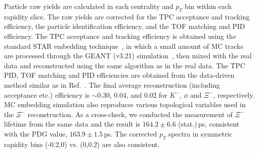 \documentclass[aps,tightenlines,superscriptaddress,twocolumn]{revtex4-1}
\begin{document}
Particle raw yields are calculated in each centrality and $p_{T}$ bin within each rapidity slice. 
The raw yields are corrected for the TPC acceptance and tracking efficiency, %
the particle identification efficiency, %
and the TOF matching and PID efficiency. 
The TPC acceptance and tracking efficiency is obtained using the standard STAR embedding technique~\cite{Adamczyk:2017iwn,star_bes_strangeness:2020}, in which a small amount of MC tracks are processed through the GEANT (v3.21) simulation~\cite{GEANT3:1994}, then mixed with the real data and reconstructed using the same algorithm as in the real data. The TPC PID, TOF matching and PID efficiencies are obtained from the data-driven method similar as in Ref.~\cite{STAR:HFTD0:2018zdy}.
The final average reconstruction (including acceptance etc.) efficiency is $\sim$0.30, 0.04, and 0.02 for $K^-$, $\phi$ and $\Xi^-$, respectively. MC embedding simulation also reproduces various topological variables used in the $\Xi^-$ reconstruction. As a cross-check, we conducted the measurement of $\Xi^{-}$ lifetime from the same data and the result is $164.2\pm6.6$ (stat.)\,ps, consistent with the PDG value, $163.9\pm1.5$\,ps. The corrected $p_T$ spectra in symmetric rapidity bins (-0.2,0) vs. (0,0.2) are also consistent.
\end{document}
